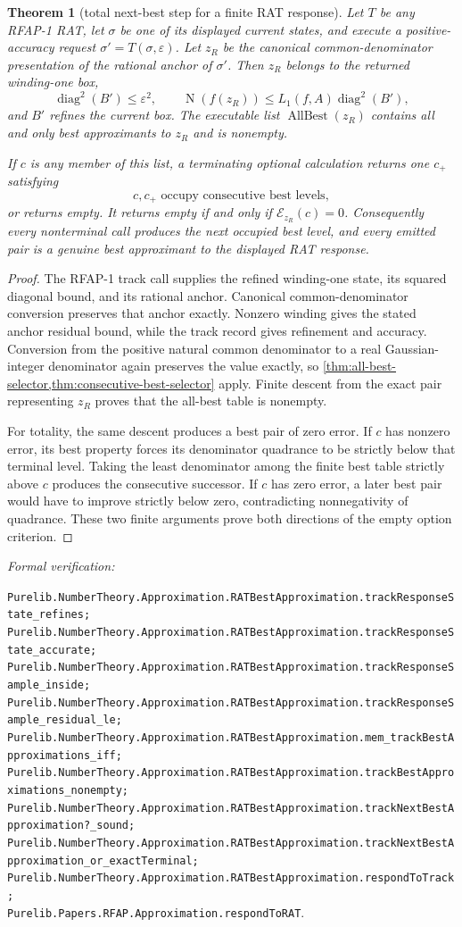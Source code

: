 \documentclass[11pt]{article}
\newtheorem{theorem}{Theorem}[section]
\newcommand{\Norm}[1]{\operatorname{N}\!\left(#1\right)}
\newcommand{\diamq}{\operatorname{diag}^{2}}
\newcommand{\eps}{\varepsilon}
\newcommand{\leanref}[1]{\par\smallskip\noindent
  \emph{Formal verification:}\par\nobreak
  {\raggedright\nolinkurl{#1}.\par}}
\begin{document}
\begin{theorem}[total next-best step for a finite RAT response]
\label{thm:rat-response-next-best}
Let $T$ be any RFAP-1 RAT, let $\sigma$ be one of its displayed current
states, and execute a positive-accuracy request
$\sigma'=T(\sigma,\eps)$.  Let $z_R$ be the canonical common-denominator
presentation of the rational anchor of $\sigma'$.  Then $z_R$ belongs to the
returned winding-one box,
\[
 \diamq(B')\le\eps^2,
 \qquad
 \Norm{f(z_R)}\le L_1(f,A)\diamq(B'),
\]
and $B'$ refines the current box.  The executable list
$\operatorname{AllBest}(z_R)$ contains all and only best approximants to
$z_R$ and is nonempty.

If $c$ is any member of this list, a terminating optional calculation returns
one $c_+$ satisfying
\[
       c,c_+\text{ occupy consecutive best levels},
\]
or returns empty.  It returns empty if and only if
$\mathcal E_{z_R}(c)=0$.  Consequently every nonterminal call produces the
next occupied best level, and every emitted pair is a genuine best
approximant to the displayed RAT response.
\end{theorem}

\begin{proof}
The RFAP-1 track call supplies the refined winding-one state, its squared
diagonal bound, and its rational anchor.  Canonical common-denominator
conversion preserves that anchor exactly.  Nonzero winding gives the stated
anchor residual bound, while the track record gives refinement and
accuracy.  Conversion from the positive natural common denominator to a real
Gaussian-integer denominator again preserves the value exactly, so
\cref{thm:all-best-selector,thm:consecutive-best-selector} apply.  Finite
descent from the exact pair representing $z_R$ proves that the all-best table
is nonempty.

For totality, the same descent produces a best pair of zero error.  If $c$
has nonzero error, its best property forces
its denominator quadrance to be strictly below that terminal level.  Taking
the least denominator among the finite best table strictly above $c$ produces
the consecutive successor.  If $c$ has zero error, a later best pair would
have to improve strictly below zero, contradicting nonnegativity of
quadrance.  These two finite arguments prove both directions of the empty
option criterion.
\end{proof}

\leanref{Purelib.NumberTheory.Approximation.RATBestApproximation.trackResponseState_refines;
Purelib.NumberTheory.Approximation.RATBestApproximation.trackResponseState_accurate;
Purelib.NumberTheory.Approximation.RATBestApproximation.trackResponseSample_inside;
Purelib.NumberTheory.Approximation.RATBestApproximation.trackResponseSample_residual_le;
Purelib.NumberTheory.Approximation.RATBestApproximation.mem_trackBestApproximations_iff;
Purelib.NumberTheory.Approximation.RATBestApproximation.trackBestApproximations_nonempty;
Purelib.NumberTheory.Approximation.RATBestApproximation.trackNextBestApproximation?_sound;
Purelib.NumberTheory.Approximation.RATBestApproximation.trackNextBestApproximation_or_exactTerminal;
Purelib.NumberTheory.Approximation.RATBestApproximation.respondToTrack;
Purelib.Papers.RFAP.Approximation.respondToRAT}
\end{document}
